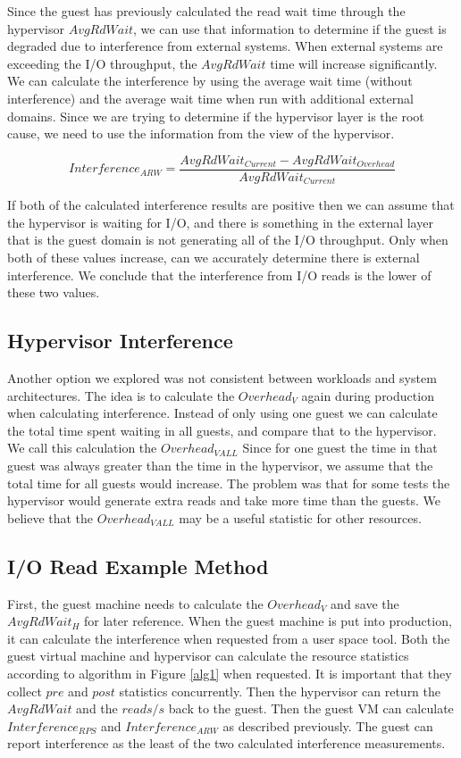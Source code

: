 Since the guest has previously calculated the read wait time through the hypervisor $AvgRdWait$, we can use that information to determine if the guest is degraded due to interference from external systems.  When external systems are exceeding the I/O throughput, the $AvgRdWait$ time will increase significantly.  We can calculate the interference by using the average wait time (without interference) and the average wait time when run with additional external domains.  Since we are trying to determine if the hypervisor layer is the root cause, we need to use the information from the view of the hypervisor.

\begin{equation}
	Interference_{ARW} = \frac{AvgRdWait_{Current} - AvgRdWait_{Overhead}}{AvgRdWait_{Current}} 
\end{equation}

If both of the calculated interference results are positive then we can assume that the hypervisor is waiting for I/O, and there is something in the external layer that is the guest domain is not generating all of the I/O throughput.
Only when both of these values increase, can we accurately determine there is external interference.
We conclude that the interference from I/O reads is the lower of these two values.

\subsection{Hypervisor Interference}
Another option we explored was not consistent between workloads and system architectures.  The idea is to calculate the $Overhead_V$ again during production when calculating interference.  Instead of only using one guest we can calculate the total time spent waiting in all guests, and compare that to the hypervisor.  We call this calculation the $Overhead_{VALL}$ Since for one guest the time in that guest was always greater than the time in the hypervisor, we assume that the total time for all guests would increase.   The problem was that for some tests the hypervisor would generate extra reads and take more time than the guests.  We believe that the $Overhead_{VALL}$ may be a useful statistic for other resources.

\subsection{I/O Read Example Method}
First, the guest machine needs to calculate the $Overhead_V$ and save the $AvgRdWait_H$ for later reference.  When the guest machine is put into production, it can calculate the interference when requested from a user space tool.  Both the guest virtual machine and hypervisor can calculate the resource statistics according to algorithm in Figure \ref{alg1} when requested.  It is important that they collect $pre$ and $post$ statistics concurrently.  Then the hypervisor can return the $AvgRdWait$ and the $reads/s$ back to the guest.  Then the guest VM can calculate $Interference_{RPS}$ and $Interference_{ARW}$ as described previously.  The guest can report interference as the least of the two calculated interference measurements.


